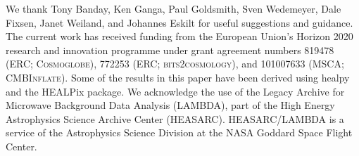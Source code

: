 \documentclass{aa}
\begin{document}
\begin{acknowledgements}
  We thank Tony Banday, Ken Ganga, Paul Goldsmith, Sven Wedemeyer, Dale Fixsen, Janet Weiland, and Johannes Eskilt
  for useful suggestions and guidance.  The current work has received
  funding from the European Union’s Horizon 2020 research and
  innovation programme under grant agreement numbers 819478 (ERC;
  \textsc{Cosmoglobe}), 772253 (ERC; \textsc{bits2cosmology}), and
  101007633 (MSCA; \textsc{CMBInflate}). Some of the results in this
  paper have been derived using healpy \citep{Zonca2019} and the
  HEALPix \citep{healpix} package.  We acknowledge the use of the
  Legacy Archive for Microwave Background Data Analysis (LAMBDA), part
  of the High Energy Astrophysics Science Archive Center
  (HEASARC). HEASARC/LAMBDA is a service of the Astrophysics Science
  Division at the NASA Goddard Space Flight Center.
\end{acknowledgements}


%



\end{document}
